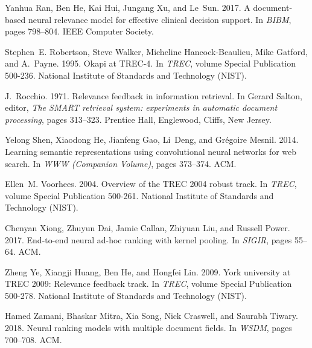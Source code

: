 \documentclass[11pt,a4paper]{article}
\begin{document}
\begin{thebibliography}{32}
	Yanhua Ran, Ben He, Kai Hui, Jungang Xu, and Le~Sun. 2017.
	\newblock A document-based neural relevance model for effective clinical
	decision support.
	\newblock In \emph{{BIBM}}, pages 798--804. {IEEE} Computer Society.
    
    
	
	Stephen~E. Robertson, Steve Walker, Micheline Hancock{-}Beaulieu, Mike Gatford,
	and A.~Payne. 1995.
	\newblock Okapi at {TREC-4}.
	\newblock In \emph{{TREC}}, volume Special Publication 500-236. National
	Institute of Standards and Technology {(NIST)}.
    
	J.~Rocchio. 1971.
	\newblock Relevance feedback in information retrieval.
	\newblock In Gerard Salton, editor, \emph{The {SMART} retrieval system:
		experiments in automatic document processing}, pages 313--323. Prentice Hall,
	Englewood, Cliffs, New Jersey.
	
	
	Yelong Shen, Xiaodong He, Jianfeng Gao, Li~Deng, and Gr{\'{e}}goire Mesnil.
	2014.
	\newblock Learning semantic representations using convolutional neural networks
	for web search.
	\newblock In \emph{{WWW} (Companion Volume)}, pages 373--374. {ACM}.
	
	Ellen~M. Voorhees. 2004.
	\newblock Overview of the {TREC} 2004 robust track.
	\newblock In \emph{{TREC}}, volume Special Publication 500-261. National
	Institute of Standards and Technology {(NIST)}.
	
	Chenyan Xiong, Zhuyun Dai, Jamie Callan, Zhiyuan Liu, and Russell Power. 2017.
	\newblock End-to-end neural ad-hoc ranking with kernel pooling.
	\newblock In \emph{{SIGIR}}, pages 55--64. {ACM}.
	
	Zheng Ye, Xiangji Huang, Ben He, and Hongfei Lin. 2009.
	\newblock York university at {TREC} 2009: Relevance feedback track.
	\newblock In \emph{{TREC}}, volume Special Publication 500-278. National
	Institute of Standards and Technology {(NIST)}.
	
	Hamed Zamani, Bhaskar Mitra, Xia Song, Nick Craswell, and Saurabh Tiwary. 2018.
	\newblock Neural ranking models with multiple document fields.
	\newblock In \emph{{WSDM}}, pages 700--708. {ACM}.
	
\end{thebibliography}
\end{document}
